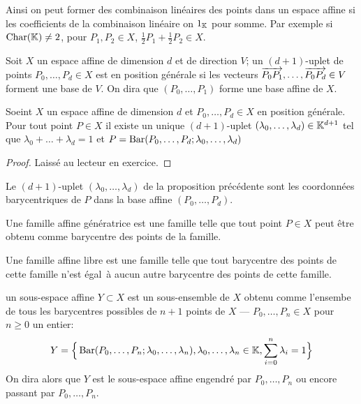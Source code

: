 \begin{remark}
	Ainsi on peut former des combinaison linéaires des points dans un espace
	affine si les coefficients de la combinaison linéaire on $1_{\mathbb{K}}$ pour somme.
	Par exemple si $\operatorname{Char}(\mathbb{K}) \neq 2$, pour $P_1, P_2 \in X$,
	$\frac{1}{2}P_1 + \frac{1}{2}P_2 \in X$.
\end{remark}

\begin{definition}
	Soit $X$ un espace affine de dimension $d$ et de direction $V$; un
	$(d+1)$-uplet de points $P_0, \dots, P_d \in X$ est en position générale si
	les vecteurs $\overrightarrow{P_0 P_1}, \dots, \overrightarrow{P_0 P_d} \in V$ forment une base
	de $V$. On dira que $(P_0, \dots, P_1)$ forme une base affine de $X$.
\end{definition}

\begin{proposition}
	Soeint $X$ un espace affine de dimension $d$ et $P_0, \dots, P_d \in X$ en
	position générale. Pour tout point $P \in X$ il existe un unique
	$(d+1)$-uplet $(\lambda_0, \dots, \lambda_d) \in \mathbb{K}^{d+1}$ tel que
	$\lambda_0 + \dots + \lambda_d = 1$ et
	$P = \operatorname{Bar}(P_0, \dots, P_d; \lambda_0, \dots, \lambda_d)$
\end{proposition}

\begin{proof}
	Laissé au lecteur en exercice.
\end{proof}

\begin{definition}
	Le $(d+1)$-uplet $(\lambda_0, \dots, \lambda_d)$ de la proposition précédente
	sont les coordonnées
	barycentriques de $P$ dans la base affine $(P_0, \dots, P_d)$.
\end{definition}

\begin{definition}
	Une famille affine génératrice est une famille telle que tout point $P \in X$
	peut être obtenu comme barycentre des points de la famille.
\end{definition}

\begin{definition}
	Une famille affine libre est une famille telle que tout barycentre des points
	de cette famille n'est égal à aucun autre barycentre des points de cette
	famille.
\end{definition}

\begin{definition}
	un sous-espace affine $Y \subset X$ est un sous-ensemble de $X$ obtenu comme
	l'ensembe de tous les barycentres possibles de $n+1$ points de $X$ --- 
	$P_0, \dots, P_n \in X$ pour $n \geq 0$ un entier:
	\begin{equation*}
		Y = \Big\{\operatorname{Bar}(P_0, \dots, P_n; \lambda_0, \dots, \lambda_n), 
		\lambda_0, \dots, \lambda_n \in \mathbb{K}, \sum_{i=0}^n \lambda_i = 1\Big\}
	\end{equation*}
	On dira alors que $Y$ est le sous-espace affine engendré par $P_0, \dots, P_n$
	ou encore passant par $P_0, \dots, P_n$.
\end{definition}


